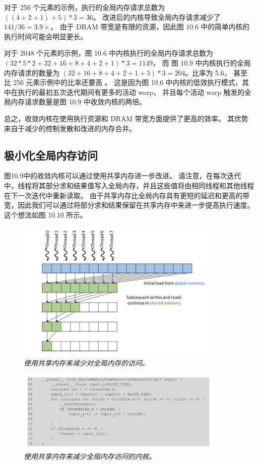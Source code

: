 对于 256 个元素的示例，执行的全局内存请求总数为 $((4+2+1)+5) * 3 = 36$。
改进后的内核导致全局内存请求减少了 $141/36 = 3.9\times$。 
由于 DRAM 带宽是有限的资源，因此图 10.6 中的简单内核的执行时间可能会明显更长。

对于 2048 个元素的示例，图 10.6 中内核执行的全局内存请求总数为 $(32 * 5 * 2+32+16+8+4+2+1) * 3 = 1149$，
而 图 10.9 中内核执行的全局内存请求的数量为 $(32+16+8+4+2+1+5) * 3 = 204$。比率为 5.6，
甚至比 256 元素示例中的比率还要高 。 
这是因为图 10.6 中内核的低效执行模式，其中在执行的最初五次迭代期间有更多的活动 warp，
并且每个活动 warp 触发的全局内存请求数量是图 10.9 中收敛内核的两倍。

总之，收敛内核在使用执行资源和 DRAM 带宽方面提供了更高的效率。 其优势来自于减少的控制发散和改进的内存合并。

\subsection{极小化全局内存访问}
图10.9中的收敛内核可以通过使用共享内存进一步改进。 
请注意，在每次迭代中，线程将其部分求和结果值写入全局内存，并且这些值将由相同线程和其他线程在下一次迭代中重新读取。 
由于共享内存比全局内存具有更短的延迟和更高的带宽，因此我们可以通过将部分求和结果保留在共享内存中来进一步提高执行速度。 
这个想法如图 10.10 所示。

\begin{figure}[H]
	\centering
	\includegraphics[width=0.9\textwidth]{figs/F10.10.png}
	\caption{\textit{使用共享内存来减少对全局内存的访问。}}
\end{figure}

\begin{figure}[H]
	\centering
	\includegraphics[width=0.9\textwidth]{figs/F10.11.png}
	\caption{\textit{使用共享内存来减少全局内存访问的内核。}}
\end{figure}

